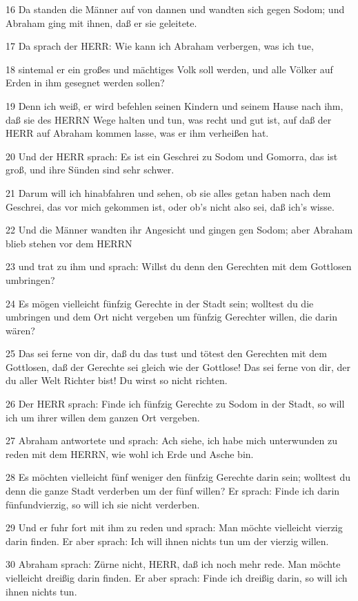 \par 16 Da standen die Männer auf von dannen und wandten sich gegen Sodom; und Abraham ging mit ihnen, daß er sie geleitete.
\par 17 Da sprach der HERR: Wie kann ich Abraham verbergen, was ich tue,
\par 18 sintemal er ein großes und mächtiges Volk soll werden, und alle Völker auf Erden in ihm gesegnet werden sollen?
\par 19 Denn ich weiß, er wird befehlen seinen Kindern und seinem Hause nach ihm, daß sie des HERRN Wege halten und tun, was recht und gut ist, auf daß der HERR auf Abraham kommen lasse, was er ihm verheißen hat.
\par 20 Und der HERR sprach: Es ist ein Geschrei zu Sodom und Gomorra, das ist groß, und ihre Sünden sind sehr schwer.
\par 21 Darum will ich hinabfahren und sehen, ob sie alles getan haben nach dem Geschrei, das vor mich gekommen ist, oder ob's nicht also sei, daß ich's wisse.
\par 22 Und die Männer wandten ihr Angesicht und gingen gen Sodom; aber Abraham blieb stehen vor dem HERRN
\par 23 und trat zu ihm und sprach: Willst du denn den Gerechten mit dem Gottlosen umbringen?
\par 24 Es mögen vielleicht fünfzig Gerechte in der Stadt sein; wolltest du die umbringen und dem Ort nicht vergeben um fünfzig Gerechter willen, die darin wären?
\par 25 Das sei ferne von dir, daß du das tust und tötest den Gerechten mit dem Gottlosen, daß der Gerechte sei gleich wie der Gottlose! Das sei ferne von dir, der du aller Welt Richter bist! Du wirst so nicht richten.
\par 26 Der HERR sprach: Finde ich fünfzig Gerechte zu Sodom in der Stadt, so will ich um ihrer willen dem ganzen Ort vergeben.
\par 27 Abraham antwortete und sprach: Ach siehe, ich habe mich unterwunden zu reden mit dem HERRN, wie wohl ich Erde und Asche bin.
\par 28 Es möchten vielleicht fünf weniger den fünfzig Gerechte darin sein; wolltest du denn die ganze Stadt verderben um der fünf willen? Er sprach: Finde ich darin fünfundvierzig, so will ich sie nicht verderben.
\par 29 Und er fuhr fort mit ihm zu reden und sprach: Man möchte vielleicht vierzig darin finden. Er aber sprach: Ich will ihnen nichts tun um der vierzig willen.
\par 30 Abraham sprach: Zürne nicht, HERR, daß ich noch mehr rede. Man möchte vielleicht dreißig darin finden. Er aber sprach: Finde ich dreißig darin, so will ich ihnen nichts tun.
